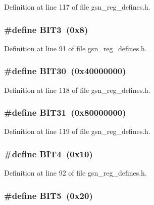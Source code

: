Definition at line 117 of file gsn\_\-reg\_\-defines.h.

\hypertarget{a00546_a8e44574a8a8becc885b05f3bc367ef6a}{
\subsubsection[{BIT3}]{\setlength{\rightskip}{0pt plus 5cm}\#define BIT3~(0x8)}}
\label{a00546_a8e44574a8a8becc885b05f3bc367ef6a}


Definition at line 91 of file gsn\_\-reg\_\-defines.h.

\hypertarget{a00546_a70105c4a8c864754c8ba9e9b0e5da52a}{
\subsubsection[{BIT30}]{\setlength{\rightskip}{0pt plus 5cm}\#define BIT30~(0x40000000)}}
\label{a00546_a70105c4a8c864754c8ba9e9b0e5da52a}


Definition at line 118 of file gsn\_\-reg\_\-defines.h.

\hypertarget{a00546_adfb09898dca36071e32cb1fbeec479e5}{
\subsubsection[{BIT31}]{\setlength{\rightskip}{0pt plus 5cm}\#define BIT31~(0x80000000)}}
\label{a00546_adfb09898dca36071e32cb1fbeec479e5}


Definition at line 119 of file gsn\_\-reg\_\-defines.h.

\hypertarget{a00546_aa731e0b6cf75f4e637ee88959315f5e4}{
\subsubsection[{BIT4}]{\setlength{\rightskip}{0pt plus 5cm}\#define BIT4~(0x10)}}
\label{a00546_aa731e0b6cf75f4e637ee88959315f5e4}


Definition at line 92 of file gsn\_\-reg\_\-defines.h.

\hypertarget{a00546_ae692bc3df48028ceb1ddc2534a993bb8}{
\subsubsection[{BIT5}]{\setlength{\rightskip}{0pt plus 5cm}\#define BIT5~(0x20)}}
\label{a00546_ae692bc3df48028ceb1ddc2534a993bb8}


